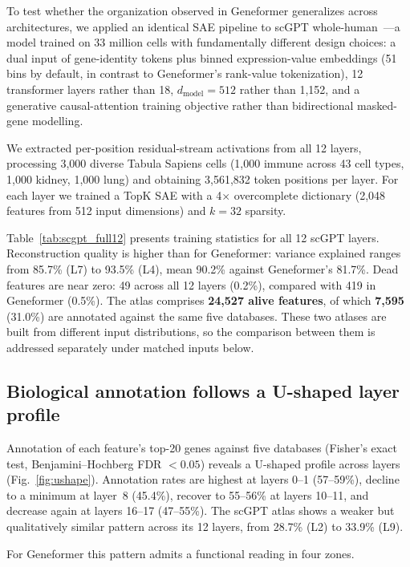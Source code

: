 To test whether the organization observed in Geneformer generalizes across architectures, we
applied an identical SAE pipeline to scGPT whole-human~\cite{cui2024scgpt}---a model trained on 33
million cells with fundamentally different design choices: a dual input of gene-identity tokens plus
binned expression-value embeddings (51 bins by default, in contrast to Geneformer's rank-value
tokenization), 12 transformer layers rather than 18, $d_\text{model}{=}512$ rather than 1,152, and a
generative causal-attention training objective rather than bidirectional masked-gene modelling.

We extracted per-position residual-stream activations from all 12 layers, processing 3,000 diverse
Tabula Sapiens cells (1,000 immune across 43 cell types, 1,000 kidney, 1,000 lung) and obtaining
3,561,832 token positions per layer. For each layer we trained a TopK SAE with a 4$\times$
overcomplete dictionary (2,048 features from 512 input dimensions) and $k{=}32$ sparsity.

Table~\ref{tab:scgpt_full12} presents training statistics for all 12 scGPT layers. Reconstruction
quality is higher than for Geneformer: variance explained ranges from 85.7\% (L7) to 93.5\% (L4),
mean 90.2\% against Geneformer's 81.7\%. Dead features are near zero: 49 across all 12 layers
(0.2\%), compared with 419 in Geneformer (0.5\%). The atlas comprises \textbf{24,527 alive
features}, of which \textbf{7,595} (31.0\%) are annotated against the same five databases. These
two atlases are built from different input distributions, so the comparison between them is
addressed separately under matched inputs below.

\subsection*{Biological annotation follows a U-shaped layer profile}
\label{sec:ushape}

Annotation of each feature's top-20 genes against five databases (Fisher's exact test,
Benjamini--Hochberg FDR $< 0.05$) reveals a U-shaped profile across layers
(Fig.~\ref{fig:ushape}). Annotation rates are highest at layers 0--1 (57--59\%), decline to a
minimum at layer~8 (45.4\%), recover to 55--56\% at layers 10--11, and decrease again at layers
16--17 (47--55\%). The scGPT atlas shows a weaker but qualitatively similar pattern across its 12
layers, from 28.7\% (L2) to 33.9\% (L9).

For Geneformer this pattern admits a functional reading in four zones.

